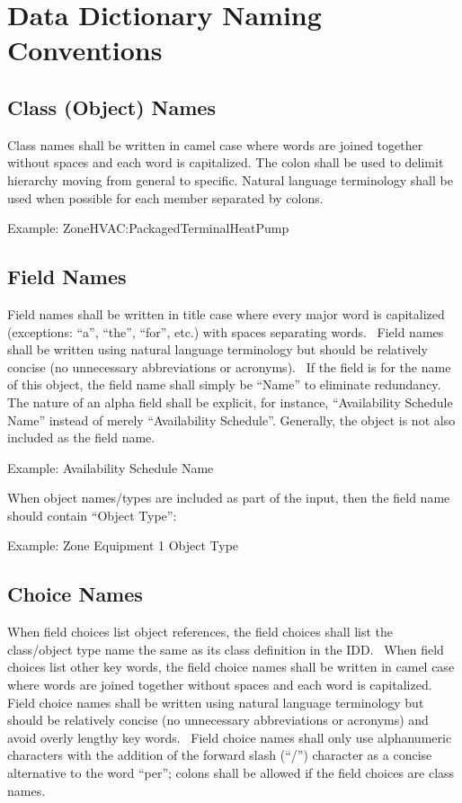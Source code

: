 \section{Data Dictionary Naming Conventions}\label{data-dictionary-naming-conventions}

\subsection{Class (Object) Names}\label{class-object-names}

Class names shall be written in camel case where words are joined together without spaces and each word is capitalized. The colon shall be used to delimit hierarchy moving from general to specific. Natural language terminology shall be used when possible for each member separated by colons.

Example: ZoneHVAC:PackagedTerminalHeatPump

\subsection{Field Names}\label{field-names}

Field names shall be written in title case where every major word is capitalized (exceptions: ``a'', ``the'', ``for'', etc.) with spaces separating words.~ Field names shall be written using natural language terminology but should be relatively concise (no unnecessary abbreviations or acronyms).~ If the field is for the name of this object, the field name shall simply be ``Name'' to eliminate redundancy.~ The nature of an alpha field shall be explicit, for instance, ``Availability Schedule Name'' instead of merely ``Availability Schedule''. Generally, the object is not also included as the field name.

Example: Availability Schedule Name

When object names/types are included as part of the input, then the field name should contain ``Object Type'':

Example: Zone Equipment 1 Object Type

\subsection{Choice Names}\label{choice-names}

When field choices list object references, the field choices shall list the class/object type name the same as its class definition in the IDD.~ When field choices list other key words, the field choice names shall be written in camel case where words are joined together without spaces and each word is capitalized.~ Field choice names shall be written using natural language terminology but should be relatively concise (no unnecessary abbreviations or acronyms) and avoid overly lengthy key words.~ Field choice names shall only use alphanumeric characters with the addition of the forward slash (``/'') character as a concise alternative to the word ``per''; colons shall be allowed if the field choices are class names.

